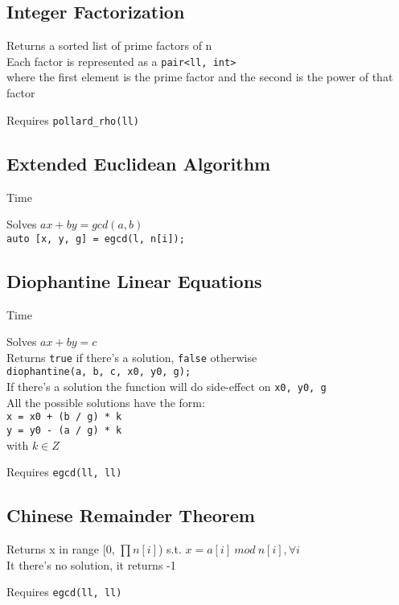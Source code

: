 \subsection{Integer Factorization}
Returns a sorted list of prime factors of n \\
Each factor is represented as a \verb|pair<ll, int>| \\
where the first element is the prime factor and the second is the power of that factor

Requires \verb|pollard_rho(ll)|



\subsection{Extended Euclidean Algorithm}
 Time

Solves $ax + by = gcd(a, b)$ \\
\verb|auto [x, y, g] = egcd(l, n[i]);|



\subsection{Diophantine Linear Equations}
 Time

Solves $ax + by = c$ \\
Returns \verb|true| if there's a solution, \verb|false| otherwise \\
\verb|diophantine(a, b, c, x0, y0, g);| \\
If there's a solution the function will do side-effect on \verb|x0, y0, g|\\
All the possible solutions have the form: \\
\verb|x = x0 + (b / g) * k| \\
\verb|y = y0 - (a / g) * k| \\
with $k \in Z$

Requires \verb|egcd(ll, ll)|



\subsection{Chinese Remainder Theorem}
Returns x in range [0, $\prod{n[i]}$) s.t.
$x = a[i] \: mod \: n[i], \forall i$ \\
It there's no solution, it returns -1

Requires \verb|egcd(ll, ll)|



